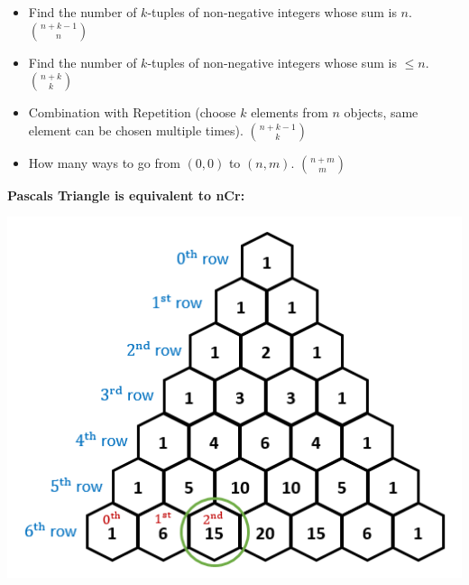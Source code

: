 \vspace{-4.5mm}
{\small
\begin{itemize}
\item Find the number of $k$-tuples of non-negative integers whose sum is $n$. \quad $\binom{n+k-1}{n}$
\item Find the number of $k$-tuples of non-negative integers whose sum is $\le n$. \quad $\binom{n+k}{k}$
\item Combination with Repetition (choose $k$ elements from $n$ objects, same element can be chosen multiple times). \quad $\binom{n+k-1}{k}$
\item How many ways to go from $(0,0)$ to $(n,m)$. \quad $\binom{n+m}{m}$
\end{itemize}\medskip\medskip\medskip
\textbf{Pascals Triangle is equivalent to nCr:}
\begin{center}
\includegraphics[width=0.7\linewidth]{images/pascals-triangle.png}
\end{center}
}
